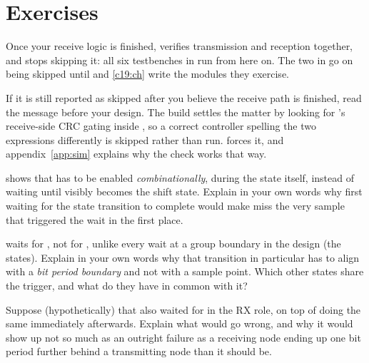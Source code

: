 
\section{Exercises}
\label{c17:sec:exercises}

\begin{aside}
Once your receive logic is finished,  verifies transmission and
reception together, and  stops skipping it: all six testbenches in
 run from here on. The two in  go on being skipped until
 and \ref{c19:ch} write the modules they exercise.

If it is still reported as skipped after you believe the receive path is finished, read the message
before your design. The build settles the matter by looking for 's receive-side CRC
gating inside , so a correct controller spelling the two expressions
differently is skipped rather than run.  forces it, and
appendix~\ref{app:sim} explains why the check works that way.
\end{aside}

\label{c17:ex:timing}
  shows that  has to be enabled
\emph{combinationally}, during the  state itself, instead of waiting until
 visibly becomes the shift state. Explain in your own words why first waiting for the
state transition to complete would make  miss the very sample that triggered the
wait in the first place.

  waits for , not for , unlike
every wait at a group boundary in the design (the  states). Explain in your own
words why that transition in particular has to align with a \emph{bit period boundary} and not with a
sample point. Which other states share the  trigger, and what do they have in
common with it?

 Suppose (hypothetically) that  also waited for  in the
RX role, on top of  doing the same immediately afterwards. Explain what would
go wrong, and why it would show up not so much as an outright failure as a receiving node ending up
one bit period further behind a transmitting node than it should be.

